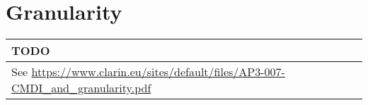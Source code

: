 \section{Granularity}\label{granularity}

\begin{longtable}[c]{@{}l@{}}
\toprule
\begin{minipage}[b]{0.07\columnwidth}\raggedright\strut
TODO
\strut\end{minipage}\tabularnewline
\midrule
\endhead
\begin{minipage}[t]{0.07\columnwidth}\raggedright\strut
See
\url{https://www.clarin.eu/sites/default/files/AP3-007-CMDI_and_granularity.pdf}
\strut\end{minipage}\tabularnewline
\bottomrule
\end{longtable}
